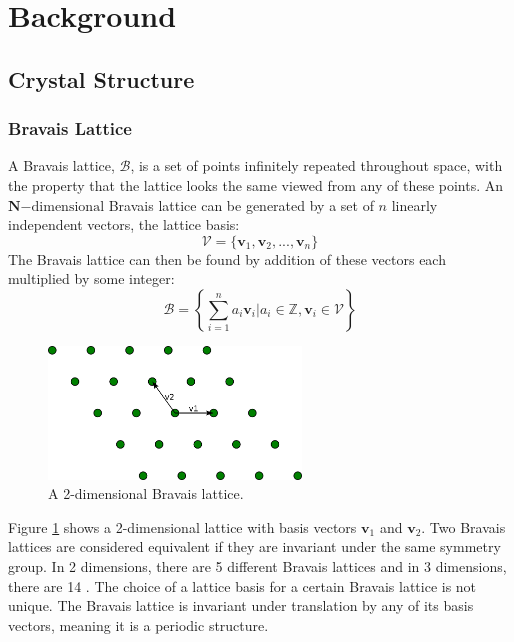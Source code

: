 \documentclass[12pt]{article}
\begin{document}
\section{Background}
\subsection{Crystal Structure}
\subsubsection{Bravais Lattice}
A Bravais lattice, $\mathcal{B}$, is a set of points infinitely repeated throughout space, with the property that the lattice looks the same viewed from any of these points. 
An $\mathbf{N}\mathrm{-dimensional}$ Bravais lattice can be generated by a set of $n$ linearly independent vectors, the lattice basis:
\begin{equation}\label{eq:lattice_basis}
	\mathcal{V} = \{\mathbf{v}_1, \mathbf{v}_2, ..., \mathbf{v}_n\}
\end{equation}
The Bravais lattice can then be found by addition of these vectors each multiplied by some integer:
\begin{equation}\label{eq:bravais_lattice}
	\mathcal{B} = \left \{\sum_{i=1}^n a_i\mathbf{v}_i \Big | a_i \in \mathbb{Z}, \mathbf{v}_i \in \mathcal{V}  \right \}
\end{equation}
\begin{figure}
	\centering
	\includegraphics[width=0.6\textwidth]{./figures/lattice_basis.png}
	\caption{A 2-dimensional Bravais lattice.}
	\label{fig:lattice_basis}
\end{figure}
Figure \ref{fig:lattice_basis} shows a 2-dimensional lattice with basis vectors $\mathbf{v}_1$ and $\mathbf{v}_2$. Two Bravais lattices are considered equivalent if they are invariant under the same symmetry group. In 2 dimensions, there are 5 different Bravais lattices and in 3 dimensions, there are 14 \cite{kittel2005introduction}. The choice of a lattice basis for a certain Bravais lattice is not unique.
The Bravais lattice is invariant under translation by any of its basis vectors, meaning it is a periodic structure. 
\end{document}
